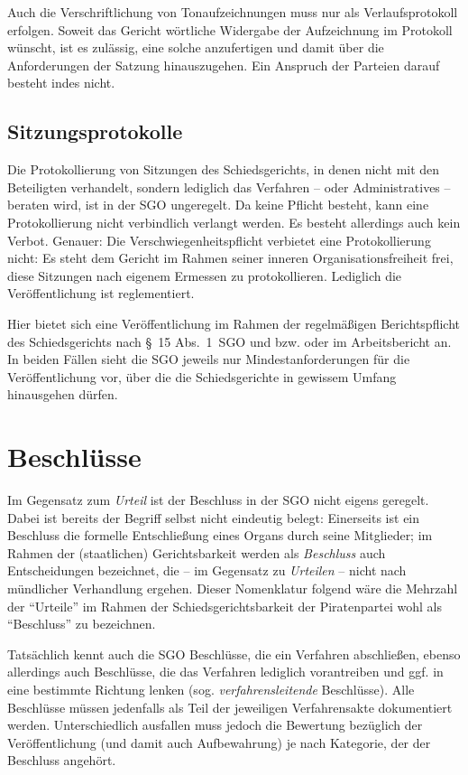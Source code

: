 Auch die Verschriftlichung von Tonaufzeichnungen muss nur als Verlaufsprotokoll erfolgen.
Soweit das Gericht wörtliche Widergabe der Aufzeichnung im Protokoll wünscht, ist es zulässig, eine solche anzufertigen und damit über die Anforderungen der Satzung hinauszugehen.
Ein Anspruch der Parteien darauf besteht indes nicht.

\subsection{Sitzungsprotokolle}
\label{Dokumentation:Protokolle:Sitzungsprotokolle}
Die Protokollierung von Sitzungen des Schiedsgerichts, in denen nicht mit den Beteiligten verhandelt, sondern lediglich das Verfahren -- oder Administratives -- beraten wird, ist in der SGO ungeregelt.
Da keine Pflicht besteht, kann eine Protokollierung nicht verbindlich verlangt werden.
Es besteht allerdings auch kein Verbot.
Genauer:
Die Verschwiegenheitspflicht verbietet eine Protokollierung nicht:
Es steht dem Gericht im Rahmen seiner inneren Organisationsfreiheit frei, diese Sitzungen nach eigenem Ermessen zu protokollieren.
Lediglich die Veröffentlichung ist reglementiert.

Hier bietet sich eine Veröffentlichung im Rahmen der regelmäßigen Berichtspflicht des Schiedsgerichts nach \S~15 Abs.~1~SGO und bzw. oder im Arbeitsbericht an.
In beiden Fällen sieht die SGO jeweils nur Mindestanforderungen für die Veröffentlichung vor, über die die Schiedsgerichte in gewissem Umfang hinausgehen dürfen.

\section{Beschlüsse}
\label{Dokumentation:Beschlüsse}
Im Gegensatz zum \emph{Urteil} ist der Beschluss in der SGO nicht eigens geregelt.
Dabei ist bereits der Begriff selbst nicht eindeutig belegt:
Einerseits ist ein Beschluss die formelle Entschließung eines Organs durch seine Mitglieder; im Rahmen der (staatlichen) Gerichtsbarkeit werden als \emph{Beschluss} auch Entscheidungen bezeichnet, die -- im Gegensatz zu \emph{Urteilen} -- nicht nach mündlicher Verhandlung ergehen.
Dieser Nomenklatur folgend wäre die Mehrzahl der \enquote{Urteile} im Rahmen der Schiedsgerichtsbarkeit der Piratenpartei wohl als \enquote{Beschluss} zu bezeichnen.%

Tatsächlich kennt auch die SGO Beschlüsse, die ein Verfahren abschließen, ebenso allerdings auch Beschlüsse, die das Verfahren lediglich vorantreiben und ggf. in eine bestimmte Richtung lenken (sog. \emph{verfahrensleitende} Beschlüsse).
Alle Beschlüsse müssen jedenfalls als Teil der jeweiligen Verfahrensakte dokumentiert werden.
Unterschiedlich ausfallen muss jedoch die Bewertung bezüglich der Veröffentlichung (und damit auch Aufbewahrung) je nach Kategorie, der der Beschluss angehört.

